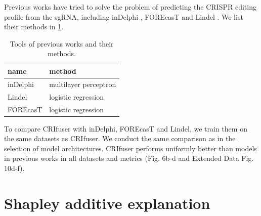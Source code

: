 \documentclass{article}
\begin{document}
Previous works have tried to solve the problem of predicting the CRISPR editing profile from the sgRNA, including inDelphi \cite{shen2018predictable}, FOREcasT\cite{allen2019predicting} and Lindel \cite{chen2019massively}. We list their methods in \cref{tab:previous_works}.
\begin{table}[H]
    \centering
    \begin{tabular}{|l|l|}
        \hline
        name & method \\
        \hline
        inDelphi\cite{shen2018predictable} & multilayer perceptron \\
        Lindel\cite{chen2019massively} & logistic regression \\
        FOREcasT\cite{allen2019predicting} & logistic regression \\
        \hline
    \end{tabular}
    \caption{Tools of previous works and their methods.}\label{tab:previous_works}
\end{table}
To compare CRIfuser with inDelphi, FOREcasT and Lindel, we train them on the same datasets as CRIfuser. We conduct the same comparison as in the selection of model architectures. CRIfuser performs uniformly better than models in previous works in all datasets and metrics (Fig. 6b-d and Extended Data Fig. 10d-f).

\section{Shapley additive explanation}
\end{document}
